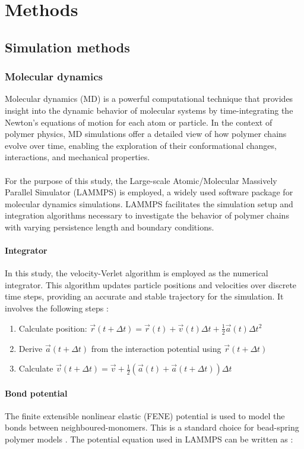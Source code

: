 \documentclass[
    paper=A4,pagesize=automedia,fontsize=12pt,
    BCOR=15mm,DIV=22,
    twoside,headinclude,footinclude=false,
    fleqn,             %
    bibliography=totocnumbered,          %
    listof=totoc,                %
    listof=flat,                 %
    cleardoublepage=empty      %
    numbers=endperiod
]{scrartcl}
\begin{document}
\section{Methods}
\subsection{Simulation methods}
\subsubsection{Molecular dynamics}
Molecular dynamics (MD) is a powerful computational technique that
provides insight into the dynamic behavior of molecular systems by 
time-integrating the Newton's equations of motion for each atom or particle. 
In the context of polymer physics, MD simulations offer a detailed view of how polymer chains evolve over time, enabling the exploration of their conformational changes, interactions, and mechanical properties.
\\
\\
For the purpose of this study, the Large-scale Atomic/Molecular Massively
Parallel Simulator (LAMMPS) \cite{LAMMPS} is employed, a widely used software package 
for molecular dynamics simulations. LAMMPS facilitates the simulation setup and 
integration algorithms necessary to investigate the behavior of 
polymer chains with varying persistence length and boundary conditions.

\paragraph{Integrator}
In this study, the velocity-Verlet algorithm is employed as the numerical integrator. 
This algorithm updates particle positions and velocities over discrete time steps,
providing an accurate and stable trajectory for the simulation.
It involves the following steps \cite{10.1063/1.442716}:
\begin{enumerate}
    \item Calculate position: $\vec{r}(t+\Delta t) = \vec{r}(t) + \vec{v}(t) \Delta t + \frac{1}{2} \vec{a}(t) \Delta{t}^2$
    \item Derive $\vec{a}(t+\Delta t)$ from the interaction potential using $\vec{r}(t+\Delta t)$
    \item Calculate $\vec{v}(t+\Delta t) = \vec{v} + \frac{1}{2}(\vec{a}(t) + \vec{a}(t+\Delta t))\Delta t$ 
\end{enumerate}

\paragraph{Bond potential}
\label{par:bond_potential}
The finite extensible nonlinear elastic (FENE) potential \cite{Kremer_ChemPhys} 
is used to model the bonds between neighboured-monomers. This is a standard 
choice for bead-spring polymer models \cite{LAMMPS}. The potential equation used in
LAMMPS can be written as \cite{LAMMPS}:
\end{document}
